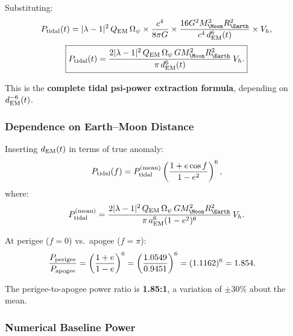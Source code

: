 \documentclass[aps,prd,twocolumn,superscriptaddress]{revtex4-2}
\newcommand{\Opsi}{\Omega_\psi}
\newcommand{\lam}{|\lambda-1|}
\begin{document}
Substituting:
\begin{equation}
P_{\rm tidal}(t) = \lam^2\,Q_{\rm EM}\,\Opsi
\times\frac{c^4}{8\pi G}
\times\frac{16 G^2 M_\Moon^2 R_\Earth^2}{c^4\,d_{\rm EM}^6(t)}
\times V_h,
\end{equation}
\begin{equation}
\boxed{
P_{\rm tidal}(t) = \frac{2\lam^2\,Q_{\rm EM}\,\Opsi\,G M_\Moon^2 R_\Earth^2}{\pi\,d_{\rm EM}^6(t)}\,V_h.
}
\label{eq:tidal-power}
\end{equation}

This is the \textbf{complete tidal psi-power extraction formula},
depending on $d_{\rm EM}^{-6}(t)$.

\subsubsection{Dependence on Earth--Moon Distance}

Inserting $d_{\rm EM}(t)$ in terms of true anomaly:
\begin{equation}
P_{\rm tidal}(f) = P_{\rm tidal}^{(\rm mean)}
\left(\frac{1 + e\cos f}{1-e^2}\right)^6,
\end{equation}
where:
\begin{equation}
P_{\rm tidal}^{(\rm mean)} = \frac{2\lam^2\,Q_{\rm EM}\,\Opsi\,G M_\Moon^2 R_\Earth^2}
{\pi\,a_{\rm EM}^6(1-e^2)^6}\,V_h.
\end{equation}

At perigee ($f = 0$) vs.\ apogee ($f = \pi$):
\begin{align}
\frac{P_{\rm perigee}}{P_{\rm apogee}}
&= \left(\frac{1+e}{1-e}\right)^6
= \left(\frac{1.0549}{0.9451}\right)^6
= (1.1162)^6 = 1.854.
\end{align}

The perigee-to-apogee power ratio is \textbf{1.85:1}, a variation of
$\pm 30\%$ about the mean.

\subsubsection{Numerical Baseline Power}
\end{document}
